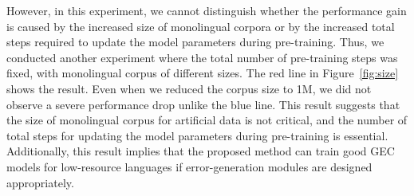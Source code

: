 \documentclass[11pt]{article}
\begin{document}
However, in this experiment, we cannot distinguish whether the performance gain is caused by the increased size of monolingual corpora
or by the increased total steps required to update the model parameters during pre-training.
Thus, we conducted another experiment where the total number of pre-training steps was fixed, with monolingual corpus of different sizes.
The red line in Figure~\ref{fig:size} shows the result.
Even when we reduced the corpus size to 1M, we did not observe a severe performance drop unlike the blue line.
This result suggests that the size of monolingual corpus for artificial data is not critical, and the number of total steps for updating the model parameters during pre-training is essential.
Additionally, this result implies that the proposed method can train good GEC models for low-resource languages if error-generation modules are designed appropriately.
\end{document}
